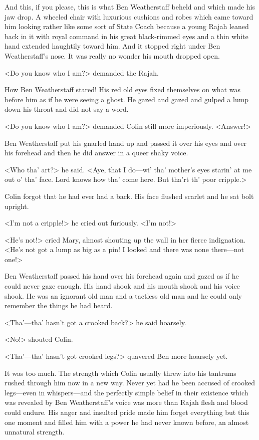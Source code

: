 And this, if you please, this is what Ben Weatherstaff beheld and which made his jaw drop. A wheeled chair with luxurious cushions and robes which came toward him looking rather like some sort of State Coach because a young Rajah leaned back in it with royal command in his great black-rimmed eyes and a thin white hand extended haughtily toward him. And it stopped right under Ben Weatherstaff's nose. It was really no wonder his mouth dropped open.

<Do you know who I am?> demanded the Rajah.

How Ben Weatherstaff stared! His red old eyes fixed themselves on what was before him as if he were seeing a ghost. He gazed and gazed and gulped a lump down his throat and did not say a word.

<Do you know who I am?> demanded Colin still more imperiously. <Answer!>

Ben Weatherstaff put his gnarled hand up and passed it over his eyes and over his forehead and then he did answer in a queer shaky voice.

<Who tha' art?> he said. <Aye, that I do—wi' tha' mother's eyes starin' at me out o' tha' face. Lord knows how tha' come here. But tha'rt th' poor cripple.>

Colin forgot that he had ever had a back. His face flushed scarlet and he sat bolt upright.

<I'm not a cripple!> he cried out furiously. <I'm not!>

<He's not!> cried Mary, almost shouting up the wall in her fierce indignation. <He's not got a lump as big as a pin! I looked and there was none there—not one!>

Ben Weatherstaff passed his hand over his forehead again and gazed as if he could never gaze enough. His hand shook and his mouth shook and his voice shook. He was an ignorant old man and a tactless old man and he could only remember the things he had heard.

<Tha'—tha' hasn't got a crooked back?> he said hoarsely.

<No!> shouted Colin.

<Tha'—tha' hasn't got crooked legs?> quavered Ben more hoarsely yet.

It was too much. The strength which Colin usually threw into his tantrums rushed through him now in a new way. Never yet had he been accused of crooked legs—even in whispers—and the perfectly simple belief in their existence which was revealed by Ben Weatherstaff's voice was more than Rajah flesh and blood could endure. His anger and insulted pride made him forget everything but this one moment and filled him with a power he had never known before, an almost unnatural strength.

